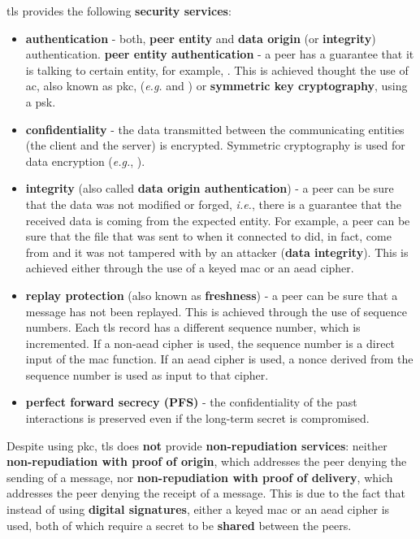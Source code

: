 \documentclass[conference]{IEEEtran}
\begin{document}
\gls{tls} provides the following \textbf{security services}:
\begin{itemize}
\item \textbf{authentication} - both, \textbf{peer entity} and \textbf{data origin} (or \textbf{integrity})
authentication.
\subitem \textbf{peer entity authentication} - a peer has a guarantee that it is talking to certain entity, for example, .
This is achieved thought the use of \gls{ac}, also known as \gls{pkc}, (\textit{e.g.}  and )
or \textbf{symmetric key cryptography}, using a \gls{psk}.
\item \textbf{confidentiality} - the data transmitted between the communicating
entities (the client and the server) is encrypted. Symmetric cryptography is
used for data encryption (\textit{e.g.}, ).
\item \textbf{integrity} (also called \textbf{data origin authentication}) - a peer can be sure that the data was not modified or forged,
\textit{i.e.}, there is a guarantee that the received data is coming from the expected entity. For example, a peer can be sure
that the  file that was sent to when it connected to  did, in fact,
come from  and it was not tampered with by an attacker (\textbf{data integrity}). This is achieved either through the use
of a keyed \gls{mac} or an \gls{aead} cipher.
\item \textbf{replay protection} (also known as \textbf{freshness}) -
a peer can be sure that a message has not been replayed. This is
achieved through the use of sequence numbers. Each \gls{tls} record has a different sequence number, which is incremented. If a non-\gls{aead} cipher is used, the sequence number is a direct input of the \gls{mac} function. If an \gls{aead} cipher is used, a nonce derived from the sequence number is used as input to that cipher.
\item \textbf{perfect forward secrecy (PFS)} - the confidentiality of the past
interactions is preserved even if the long-term secret is compromised.
\end{itemize}

Despite using \gls{pkc}, \gls{tls} does \textbf{not} provide \textbf{non-repudiation services}:
neither \textbf{non-repudiation with proof of origin}, which addresses the peer denying
the sending of a message, nor \textbf{non-repudiation with proof of delivery}, which
addresses the peer denying the receipt of a message. This is due to the fact that
instead of using \textbf{digital signatures}, either a keyed \gls{mac} or an \gls{aead}
cipher is used, both of which require a secret to be \textbf{shared} between the peers.
\end{document}
